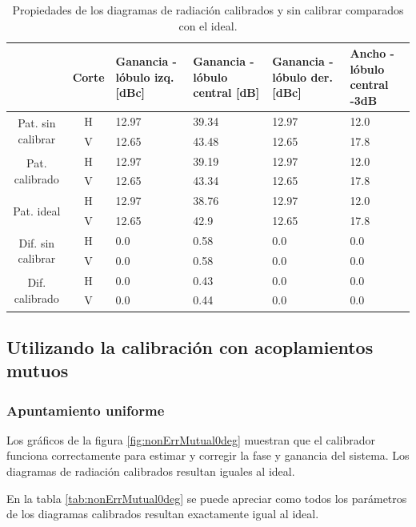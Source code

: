 \begin{table}[H]
  \footnotesize
  \centering
  \begin{tabular}{|c|c|p{2cm}|p{2.5cm}|p{2.5cm}|p{2.5cm}|}
    \cline{2-6}
    \multicolumn{1}{c|}{} & Corte & Ganancia - lóbulo izq. [dBc] & Ganancia - lóbulo central [dB] &
    Ganancia - lóbulo der. [dBc] & Ancho - lóbulo central -3dB \tabularnewline\hline
    \multirow{2}{2cm}{Pat. sin calibrar} & H & 12.97 & 39.34 & 12.97 & 12.0 \tabularnewline\cline{2-6}
     & V & 12.65 & 43.48 & 12.65 & 17.8 \tabularnewline\hline
    \multirow{2}{2cm}{Pat. calibrado} & H & 12.97 & 39.19 & 12.97 & 12.0 \tabularnewline\cline{2-6}
     & V & 12.65 & 43.34 & 12.65 & 17.8 \tabularnewline\hline
    \multirow{2}{2cm}{Pat. ideal} & H & 12.97 & 38.76 & 12.97 & 12.0 \tabularnewline\cline{2-6}
     & V & 12.65 & 42.9 & 12.65 & 17.8 \tabularnewline\hline
    \multirow{2}{2cm}{Dif. sin calibrar} & H & 0.0 & 0.58 & 0.0 & 0.0\tabularnewline\cline{2-6}
     & V & 0.0 & 0.58 & 0.0 & 0.0 \tabularnewline\hline
    \multirow{2}{2cm}{Dif. calibrado} & H & 0.0 & 0.43 & 0.0 & 0.0 \tabularnewline\cline{2-6}
     & V & 0.0 & 0.44 & 0.0 & 0.0 \tabularnewline\hline
  \end{tabular}
  \caption{Propiedades de los diagramas de radiación calibrados y sin calibrar comparados con el ideal.}
  \label{tab:nonErrClassical10degRow}
\end{table}


\subsection{Utilizando la calibración con acoplamientos mutuos}


\subsubsection{Apuntamiento uniforme}

Los gráficos de la figura \ref{fig:nonErrMutual0deg} muestran que el calibrador funciona correctamente para estimar y corregir la 
fase y ganancia del sistema. Los diagramas de radiación calibrados resultan iguales al ideal.

En la tabla \ref{tab:nonErrMutual0deg} se puede apreciar como todos los parámetros de los diagramas calibrados resultan 
exactamente igual al ideal.


